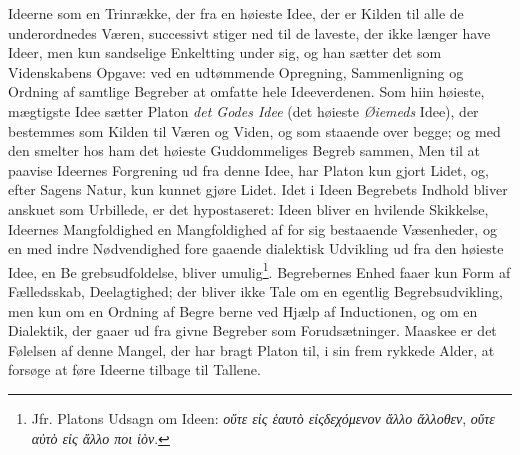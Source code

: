 \documentclass[12pt,a4paper]{book}
\newcommand{\gk}[1]{\textit{#1}}
\begin{document}
Ideerne som en Trinrække, der fra en høieste Idee, der er
Kilden til alle de underordnedes Væren, successivt stiger ned
til de laveste, der ikke længer have Ideer, men kun sandselige
Enkeltting under sig, og han sætter det som Videnskabens
Opgave: ved en udtømmende Opregning, Sammenligning og
Ordning af samtlige Begreber at omfatte hele Ideeverdenen.
Som hiin høieste, mægtigste Idee sætter Platon \emph{det Godes
Idee} (det høieste \emph{Øiemeds} Idee), der bestemmes som Kilden
til Væren og Viden, og som staaende over begge; og med den
smelter hos ham det høieste Guddommeliges Begreb sammen,
Men til at paavise Ideernes Forgrening ud fra denne Idee, har
Platon kun gjort Lidet, og, efter Sagens Natur, kun kunnet
gjøre Lidet. Idet i Ideen Begrebets Indhold bliver anskuet
som Urbillede, er det hypostaseret: Ideen bliver en hvilende
Skikkelse, Ideernes Mangfoldighed en Mangfoldighed af for sig
bestaaende Væsenheder, og en med indre Nødvendighed fore\-%
gaaende dialektisk Udvikling ud fra den høieste Idee, en Be\-%
grebsudfoldelse, bliver umulig\footnote{Jfr. Platons Udsagn om Ideen: \gk{οὔτε εἰς ἑαυτὸ εἰςδεχόμενον ἄλλο ἄλλοθεν}, \gk{οὔτε αὐτὸ εἰς ἄλλο ποι ἰὸν}.}. Begrebernes Enhed faaer kun
Form af Fælledsskab, Deelagtighed; der bliver ikke Tale om en
egentlig Begrebsudvikling, men kun om en Ordning af Begre\-%
berne ved Hjælp af Inductionen, og om en Dialektik, der gaaer
ud fra givne Begreber som Forudsætninger. Maaskee er det
Følelsen af denne Mangel, der har bragt Platon til, i sin frem\-%
rykkede Alder, at forsøge at føre Ideerne tilbage til Tallene.
\end{document}
